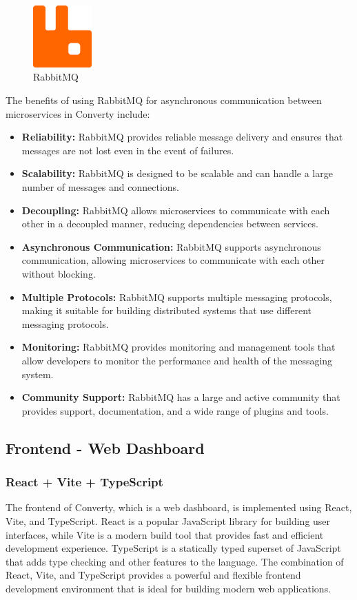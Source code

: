 \begin{figure}[H]
    \centering
    \includegraphics[width=0.2\textwidth]{Images/rabbitmq.png}
    \caption{RabbitMQ}
    \label{fig:rabbitmq}
\end{figure}

The benefits of using RabbitMQ for asynchronous communication between microservices in Converty include:

\begin{itemize}
    \item \textbf{Reliability:} RabbitMQ provides reliable message delivery and ensures that messages are not lost even in the event of failures.
    \item \textbf{Scalability:} RabbitMQ is designed to be scalable and can handle a large number of messages and connections.
    \item \textbf{Decoupling:} RabbitMQ allows microservices to communicate with each other in a decoupled manner, reducing dependencies between services.
    \item \textbf{Asynchronous Communication:} RabbitMQ supports asynchronous communication, allowing microservices to communicate with each other without blocking.
    \item \textbf{Multiple Protocols:} RabbitMQ supports multiple messaging protocols, making it suitable for building distributed systems that use different messaging protocols.
    \item \textbf{Monitoring:} RabbitMQ provides monitoring and management tools that allow developers to monitor the performance and health of the messaging system.
    \item \textbf{Community Support:} RabbitMQ has a large and active community that provides support, documentation, and a wide range of plugins and tools.
\end{itemize}

\subsection{Frontend - Web Dashboard}

\subsubsection{React + Vite + TypeScript}
The frontend of Converty, which is a web dashboard, is implemented using React, Vite, and TypeScript. React is a popular JavaScript library for building user interfaces, while Vite is a modern build tool that provides fast and efficient development experience. TypeScript is a statically typed superset of JavaScript that adds type checking and other features to the language. The combination of React, Vite, and TypeScript provides a powerful and flexible frontend development environment that is ideal for building modern web applications.

